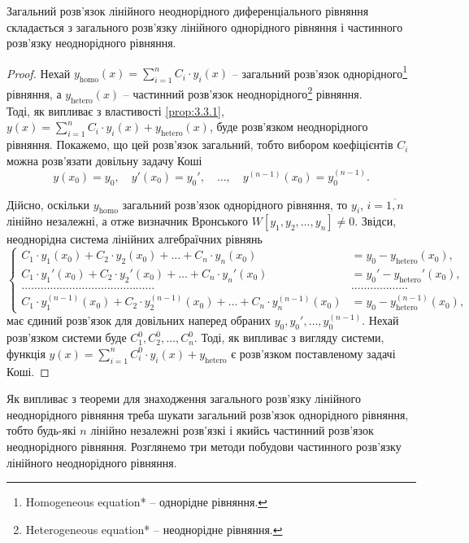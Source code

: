 \begin{theorem}
	Загальний розв’язок лінійного неоднорідного диференціального рівняння складається з загального розв’язку лінійного однорідного рівняння і частинного розв’язку неоднорідного рівняння.
\end{theorem}
\begin{proof}
	Нехай $y_{\text{homo}}(x) = \sum_{i = 1}^n C_i \cdot y_i(x)$ -- загальний розв’язок однорідного\footnote{Homogeneous equation* -- однорідне рівняння.} рівняння, а $y_{\text{hetero}}(x)$ -- частинний розв’язок неоднорідного\footnote{Heterogeneous equation* -- неоднорідне рівняння.} рівняння. \\

	Тоді, як випливає з властивості \ref{prop:3.3.1}, $y(x) = \sum_{i = 1}^n C_i \cdot y_i(x) + y_{\text{hetero}}(x)$, буде розв’язком неоднорідного рівняння. Покажемо, що цей розв’язок  загальний, тобто вибором коефіцієнтів $C_i$ можна розв’язати довільну задачу Коші
	\begin{equation*}
		y(x_0) = y_0, \quad y'(x_0) = y_0', \quad \ldots, \quad y^{(n - 1)}(x_0) = y_0^{(n - 1)}.
	\end{equation*}

	Дійсно, оскільки $y_{\text{homo}}$ загальний розв’язок однорідного рівняння, то $y_i$, $i = \overline{1, n}$ лінійно незалежні, а отже визначник Вронського $W[y_1, y_2, \ldots, y_n] \ne 0$. Звідси, неоднорідна система лінійних алгебраїчних рівнянь 
	\begin{equation*}
		\left\{ \begin{aligned}
			C_1 \cdot y_1(x_0) + C_2 \cdot y_2(x_0) + \ldots + C_n \cdot y_n(x_0) &= y_0 - y_{\text{hetero}}(x_0), \\
			C_1 \cdot y_1'(x_0) + C_2 \cdot y_2'(x_0) + \ldots + C_n \cdot y_n'(x_0) &= y_0' - y_{\text{hetero}}'(x_0), \\
			\ldots \ldots \ldots \ldots \ldots \ldots \ldots \ldots \ldots \ldots \ldots \ldots \ldots \ldots & \ldots \ldots \ldots \ldots \ldots \ldots 	\\
			C_1 \cdot y_1^{(n - 1)}(x_0) + C_2 \cdot y_2^{(n - 1)}(x_0) + \ldots + C_n \cdot y_n^{(n - 1)}(x_0) &= y_0 - y_{\text{hetero}}^{(n - 1)}(x_0),
		\end{aligned} \right.
	\end{equation*}
	має єдиний розв’язок для довільних наперед обраних $y_0, y_0', \ldots, y_0^{(n - 1)}$. Нехай розв’язком системи буде $C_1^0, C_2^0, \ldots, C_n^0$. Тоді, як випливає з вигляду системи, функція $y(x) = \sum_{i = 1}^n C_i^0 \cdot y_i(x) + y_{\text{hetero}}$ є розв’язком поставленому задачі Коші.
\end{proof}

Як випливає з теореми для знаходження загального розв’язку лінійного неоднорідного рівняння треба шукати загальний розв’язок однорідного рівняння, тобто будь-які $n$ лінійно незалежні розв’язкі і якийсь частинний розв’язок неоднорідного рівняння. Розглянемо три методи побудови частинного розв’язку лінійного неоднорідного рівняння.